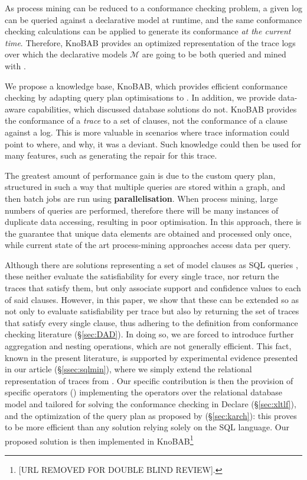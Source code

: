 As process mining can be reduced to a conformance checking problem, a given log can be queried against a declarative model at runtime, and the same conformance checking calculations can be applied to generate its conformance \emph{at the current time}. Therefore, KnoBAB provides an optimized representation of the trace logs over which the declarative models $\mathcal{M}$ are going to be both queried and mined with \LTLf.

We propose a knowledge base, KnoBAB, which provides efficient conformance checking by adapting query plan optimisations \cite{BellatrecheKB21} to \LTLf. In addition, we provide data-aware capabilities, which discussed database solutions do not. KnoBAB provides the conformance of a \emph{trace} to a set of clauses, not the conformance of a clause against a log. This is more valuable in scenarios where trace information could point to where, and why, it was a deviant. Such knowledge could then be used for many features, such as generating the repair for this trace.
\medskip


The greatest amount of performance gain is due to the custom query plan, structured in such a way that multiple queries are stored within a graph, and then batch jobs are run using \textbf{parallelisation}. When process mining, large numbers of queries are performed, therefore there will be many instances of duplicate data accessing, resulting in poor optimisation. In this approach, there is the guarantee that unique data elements are obtained and processed only once, while current state of the art process-mining approaches access data per query. 
\fi

Although there are solutions representing a set of model clauses as SQL queries \cite{Schonig15,SchonigRCJM16}, these neither evaluate the satisfiability for every single trace, nor return the traces that satisfy them, but only associate support and confidence values to each of said clauses. However, in this paper, we show that these can be extended so as not only to evaluate satisfiability per trace but also by returning the set of traces that satisfy every single clause, thus adhering to the definition from conformance checking literature (\S\ref{sec:DAD}). In doing so,  we are forced to introduce further aggregation and nesting operations, which are not generally efficient. This fact, known in the present literature, is supported by experimental evidence presented in our article (\S\ref{ssec:sqlmin}), where we simply extend the relational representation of traces from \cite{Schonig15,SchonigRCJM16}. Our specific contribution is then the provision of specific operators (\xLTLf) implementing the \LTLf operators over the relational database model and tailored for solving the conformance checking in Declare (\S\ref{sec:xltlf}), and the optimization of the query plan as proposed by \cite{BellatrecheKB21} (\S\ref{sec:karch}): this proves to be more efficient than any solution relying solely on the SQL language. Our proposed solution is then implemented in KnoBAB\footnote{[URL REMOVED FOR DOUBLE BLIND REVIEW].}

